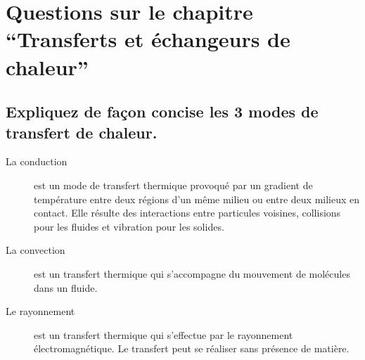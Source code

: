 \section{Questions sur le chapitre ``Transferts et échangeurs de chaleur''}
\subsection{Expliquez de façon concise les 3 modes de transfert de chaleur.}
\begin{description}
	\item[La conduction] est un mode de transfert thermique provoqué par un gradient de température entre deux régions d'un même milieu ou entre deux milieux en contact. Elle résulte des interactions entre particules voisines, collisions pour les fluides et vibration pour les solides. 
	\item[La convection] est un transfert thermique qui s'accompagne du mouvement de molécules dans un fluide.
	\item[Le rayonnement] est un transfert thermique qui s'effectue par le rayonnement électromagnétique. Le transfert peut se réaliser sans présence de matière.
\end{description}


